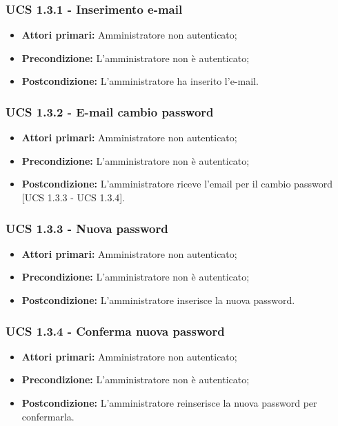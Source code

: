 \subsubsection{UCS 1.3.1 - Inserimento e-mail}
\begin{itemize}
\item \textbf{Attori primari:} Amministratore non autenticato;
\item \textbf{Precondizione:} L'amministratore non è autenticato; %
\item \textbf{Postcondizione:} L'amministratore ha inserito l'e-mail.
\end{itemize}

\subsubsection{UCS 1.3.2 - E-mail cambio password}
\begin{itemize}
\item \textbf{Attori primari:} Amministratore non autenticato;
\item \textbf{Precondizione:} L'amministratore non è autenticato;
\item \textbf{Postcondizione:} L'amministratore riceve l'email per il cambio password [UCS 1.3.3 - UCS 1.3.4].
\end{itemize}

\subsubsection{UCS 1.3.3 - Nuova password}
\begin{itemize}
\item \textbf{Attori primari:} Amministratore non autenticato;
\item \textbf{Precondizione:}  L'amministratore non è autenticato;
\item \textbf{Postcondizione:} L'amministratore inserisce la nuova password.
\end{itemize}

\subsubsection{UCS 1.3.4 - Conferma nuova password}
\begin{itemize}
\item \textbf{Attori primari:} Amministratore non autenticato;
\item \textbf{Precondizione:} L'amministratore non è autenticato;
\item \textbf{Postcondizione:} L'amministratore reinserisce la nuova password per confermarla.
\end{itemize}

